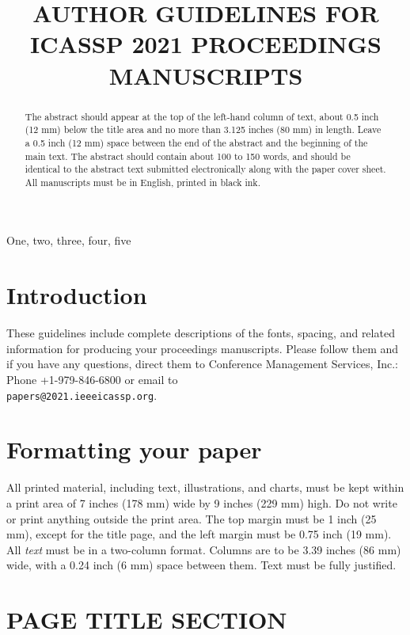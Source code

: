 \documentclass{article}
\title{AUTHOR GUIDELINES FOR ICASSP 2021 PROCEEDINGS MANUSCRIPTS}
\begin{document}
	\ninept
	\maketitle
	\begin{abstract}
		The abstract should appear at the top of the left-hand column of text, about
		0.5 inch (12 mm) below the title area and no more than 3.125 inches (80 mm) in
		length.  Leave a 0.5 inch (12 mm) space between the end of the abstract and the
		beginning of the main text.  The abstract should contain about 100 to 150
		words, and should be identical to the abstract text submitted electronically
		along with the paper cover sheet.  All manuscripts must be in English, printed
		in black ink.
	\end{abstract}
	\begin{keywords}
		One, two, three, four, five
	\end{keywords}
	\section{Introduction}
	\label{sec:intro}
	
	These guidelines include complete descriptions of the fonts, spacing, and
	related information for producing your proceedings manuscripts. Please follow
	them and if you have any questions, direct them to Conference Management
	Services, Inc.: Phone +1-979-846-6800 or email
	to \\\texttt{papers@2021.ieeeicassp.org}.
	
	\section{Formatting your paper}
	\label{sec:format}
	
	All printed material, including text, illustrations, and charts, must be kept
	within a print area of 7 inches (178 mm) wide by 9 inches (229 mm) high. Do
	not write or print anything outside the print area. The top margin must be 1
	inch (25 mm), except for the title page, and the left margin must be 0.75 inch
	(19 mm).  All {\it text} must be in a two-column format. Columns are to be 3.39
	inches (86 mm) wide, with a 0.24 inch (6 mm) space between them. Text must be
	fully justified.
	
	\section{PAGE TITLE SECTION}
	\label{sec:pagestyle}
	
\end{document}
